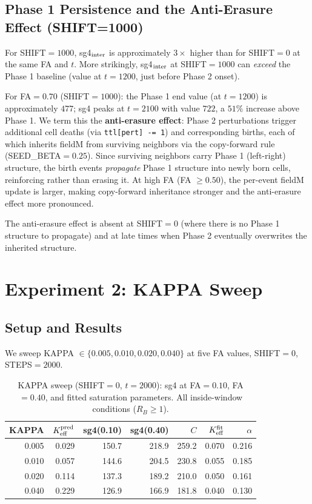 \documentclass[11pt]{article}
\begin{document}
\subsection{Phase 1 Persistence and the Anti-Erasure Effect (SHIFT=1000)}

For SHIFT$=1000$, sg4$_{\rm inter}$ is approximately $3\times$ higher than
for SHIFT$=0$ at the same FA and $t$.
More strikingly, sg4$_{\rm inter}$ at SHIFT$=1000$ can \emph{exceed} the
Phase 1 baseline (value at $t=1200$, just before Phase 2 onset).

For FA$=0.70$ (SHIFT$=1000$):
the Phase 1 end value (at $t=1200$) is approximately $477$;
sg4 peaks at $t=2100$ with value $722$, a $51\%$ increase above Phase 1.
We term this the \textbf{anti-erasure effect}: Phase 2 perturbations
trigger additional cell deaths (via \texttt{ttl[pert] -= 1}) and
corresponding births, each of which inherits fieldM from surviving neighbors
via the copy-forward rule (SEED\_BETA$=0.25$).
Since surviving neighbors carry Phase 1 (left-right) structure,
the birth events \emph{propagate} Phase 1 structure into newly born cells,
reinforcing rather than erasing it.
At high FA (FA $\geq 0.50$), the per-event fieldM update is larger,
making copy-forward inheritance stronger and the anti-erasure effect
more pronounced.

The anti-erasure effect is absent at SHIFT$=0$ (where there is no Phase 1
structure to propagate) and at late times when Phase 2 eventually
overwrites the inherited structure.

\section{Experiment 2: KAPPA Sweep}

\subsection{Setup and Results}

We sweep KAPPA $\in \{0.005, 0.010, 0.020, 0.040\}$ at five FA values,
SHIFT$=0$, STEPS$=2000$.

\begin{table}[ht]
\centering
\caption{KAPPA sweep (SHIFT$=0$, $t=2000$): sg4 at FA$=0.10$, FA$=0.40$, and
fitted saturation parameters.
All inside-window conditions ($R_B \geq 1$).}
\label{tab:kappa}
\begin{tabular}{rrrrrrr}
\toprule
KAPPA & $K_{\rm eff}^{\rm pred}$ & sg4(0.10) & sg4(0.40) & $C$ & $K_{\rm eff}^{\rm fit}$ & $\alpha$ \\
\midrule
0.005 & 0.029 & 150.7 & 218.9 & 259.2 & 0.070 & 0.216 \\
0.010 & 0.057 & 144.6 & 204.5 & 230.8 & 0.055 & 0.185 \\
0.020 & 0.114 & 137.3 & 189.2 & 210.0 & 0.050 & 0.161 \\
0.040 & 0.229 & 126.9 & 166.9 & 181.8 & 0.040 & 0.130 \\
\bottomrule
\end{tabular}
\end{table}
\end{document}
